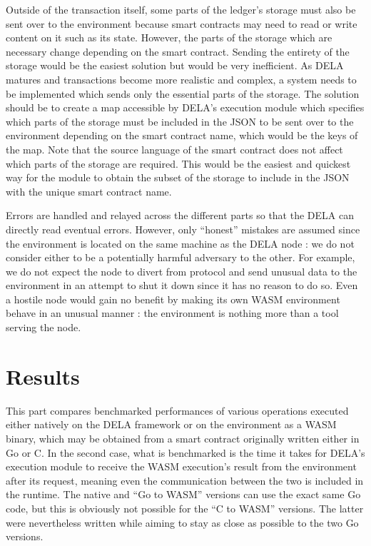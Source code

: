 \documentclass[11pt, a4paper, twoside, openright]{article}
\begin{document}
Outside of the transaction itself, some parts of the ledger's storage must also be sent over to the environment because smart contracts may need to read or write content on it such as its state. However, the parts of the storage which are necessary change depending on the smart contract. Sending the entirety of the storage would be the easiest solution but would be very inefficient. As DELA matures and transactions become more realistic and complex, a system needs to be implemented which sends only the essential parts of the storage. The solution should be to create a map accessible by DELA's execution module which specifies which parts of the storage must be included in the JSON to be sent over to the environment depending on the smart contract name, which would be the keys of the map. Note that the source language of the smart contract does not affect which parts of the storage are required. This would be the easiest and quickest way for the module to obtain the subset of the storage to include in the JSON with the unique smart contract name.

Errors are handled and relayed across the different parts so that the DELA can directly read eventual errors. However, only ``honest'' mistakes are assumed since the environment is located on the same machine as the DELA node : we do not consider either to be a potentially harmful adversary to the other. For example, we do not expect the node to divert from protocol and send unusual data to the environment in an attempt to shut it down since it has no reason to do so. Even a hostile node would gain no benefit by making its own WASM environment behave in an unusual manner : the environment is nothing more than a tool serving the node.
\section{Results}
This part compares benchmarked performances of various operations executed either natively on the DELA framework or on the environment as a WASM binary, which may be obtained from a smart contract originally written either in Go or C. In the second case, what is benchmarked is the time it takes for DELA's execution module to receive the WASM execution's result from the environment after its request, meaning even the communication between the two is included in the runtime. The native and ``Go to WASM'' versions can use the exact same Go code, but this is obviously not possible for the ``C to WASM'' versions. The latter were nevertheless written while aiming to stay as close as possible to the two Go versions.
\end{document}
